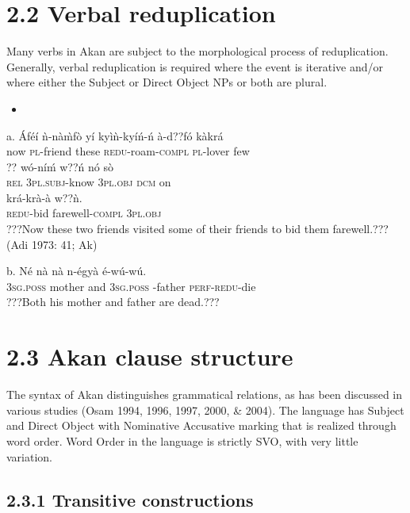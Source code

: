 \documentclass[output=paper]{langsci/langscibook}
\begin{document}
\section{2.2  Verbal reduplication}

Many verbs in Akan are subject to the morphological process of reduplication. Generally, verbal reduplication is required where the event is iterative and/or where either the Subject or Direct Object NPs or both are plural.

\begin{itemize}
\item \end{itemize}
\gll a.  \'{A}f\'{e}\'{i}  \`{n}-n\`{a}\`{m}f\`{o}   y\'{i}   ky\`{i}\`{n}-ky\'{i}\'{n}-\'{n}     \`{a}-d??f\'{o}     k\`{a}kr\'{a} \\
       now  \textsc{pl}{}-friend  these  \textsc{redu}{}-roam-\textsc{compl}  \textsc{pl}{}-lover  few  \\
\gll   ??  w\'{o}-n\'{i}\'{m}     w??\'{n}     n\'{o}   s\`{o} \\
       \textsc{rel}  \textsc{3pl.subj}{}-know  \textsc{3pl.obj}  \textsc{dcm}  on\\
\gll   kr\'{a}-kr\`{a}-\`{a}       w??\`{n}.\\
       \textsc{redu}{}-bid farewell-\textsc{compl}  \textsc{3pl.obj}\\
\glt   ???Now these two friends visited some of their friends to bid them farewell.??? (Adi 1973: 41; Ak)
\z

\gll  b.  N\'{e}    n\`{a}    n\`{a}  n-\'{e}gy\`{a}      \'{e}-w\'{u}-w\'{u}.\\
       \textsc{3sg.poss}  mother    and  \textsc{3sg.poss} -father  \textsc{perf-redu}{}-die\\
\glt   ???Both his mother and father are dead.??? \citep[24]{Martin1936}
\z

\section{2.3  Akan clause structure}

The syntax of Akan distinguishes grammatical relations, as has been discussed in various studies (Osam 1994, 1996, 1997, 2000, \& 2004). The language has Subject and Direct Object with Nominative Accusative marking that is realized through word order. Word Order in the language is strictly SVO, with very little variation.

\subsection{2.3.1  Transitive constructions}
\end{document}

